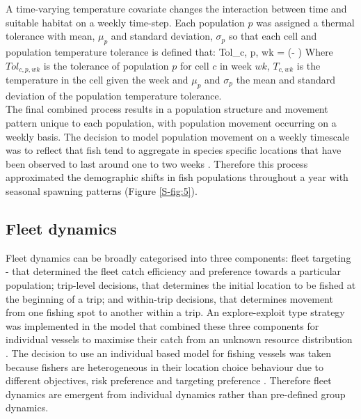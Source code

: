 \documentclass[review]{elsarticle}
\let\oldequation\equation
\let\oldendequation\endequation
\renewenvironment{equation}
 {\linenomathNonumbers\oldequation}
 {\oldendequation\endlinenomath}
\begin{document}
A time-varying temperature covariate changes the interaction between time and
suitable habitat on a weekly time-step. Each population $p$ was assigned a
thermal tolerance with mean, $\mu_{p}$ and standard deviation, $\sigma_{p}$ so that
each cell and population temperature tolerance is defined that:
\begin{equation}
	Tol_{c, p, wk} =  \cdot \exp(-
		 )	
\end{equation}
Where $Tol_{c, p, wk}$ is the tolerance of population $p$ for cell $c$ in week
$wk$, $T_{c, wk}$ is the temperature in the cell given the week and $\mu_{p}$
and $\sigma_{p}$ the mean and standard deviation of the population temperature
tolerance. \\

The final combined process results in a population structure and movement
pattern unique to each population, with population movement occurring on a weekly
basis. The decision to model population movement on a weekly timescale was to
reflect that fish tend to aggregate in species specific locations that have
been observed to last around one to two weeks \citep{Poos2007}. Therefore this
process approximated the demographic shifts in fish populations throughout a
year with seasonal spawning patterns (Figure \ref{S-fig:5}).

\subsection{Fleet dynamics}

Fleet dynamics can be broadly categorised into three components: fleet
targeting - that determined the fleet catch efficiency and preference towards a
particular population; trip-level decisions, that determines the initial location
to be fished at the beginning of a trip; and within-trip decisions, that
determines movement from one fishing spot to another within a trip. An
explore-exploit type strategy was implemented in the model that combined these
three components for individual vessels to maximise their catch from an unknown
resource distribution \citep{Bailey2018}. The decision to use an individual
based model for fishing vessels was taken because fishers are heterogeneous in
their location choice behaviour due to different objectives, risk preference
and targeting preference \citep{VanPutten2012a, Boonstra2015}. Therefore fleet
dynamics are emergent from individual dynamics rather than pre-defined group
dynamics. 
\end{document}
